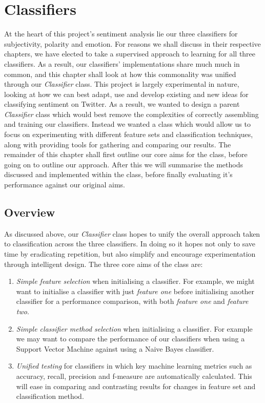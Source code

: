 \chapter{Classifiers}
\label{classifiers}

At the heart of this project's sentiment analysis lie our three classifiers for subjectivity, polarity and emotion. For reasons we shall discuss in their respective chapters, we have elected to take a supervised approach to learning for all three classifiers. As a result, our classifiers' implementations share much much in common, and this chapter shall look at how this commonality was unified through our \emph{Classifier} class. This project is largely experimental in nature, looking at how we can best adapt, use and develop existing and new ideas for classifying sentiment on Twitter. As a result, we wanted to design a parent \emph{Classifier} class which would best remove the  complexities of correctly assembling and training our classifiers. Instead we wanted a class which would allow us to focus on experimenting with different feature sets and classification techniques, along with providing tools for gathering and comparing our results. The remainder of this chapter shall first outline our core aims for the class, before going on to outline our approach. After this we will summarise the methods discussed and implemented within the class, before finally evaluating it's performance against our original aims.

\section{Overview}
\label{overview}

As discussed above, our \emph{Classifier} class hopes to unify the overall approach taken to classification across the three classifiers. In doing so it hopes not only to save time by eradicating repetition, but also simplify and encourage experimentation through intelligent design. The three core aims of the class are:

\begin{enumerate}
	\item \emph{Simple feature selection} when initialising a classifier. For example, we might want to initialise a classifier with just \emph{feature one} before initialising another classifier for a performance comparison, with both \emph{feature one} and \emph{feature two}.
	\item \emph{Simple classifier method selection} when initialising a classifier. For example we may want to compare the performance of our classifiers when using a Support Vector Machine against using a Naive Bayes classifier.
	\item \emph{Unified testing} for classifiers in which key machine learning metrics such as accuracy, recall, precision and f-measure are automatically calculated. This will ease in comparing and contrasting results for changes in feature set and classification method.
\end{enumerate}

